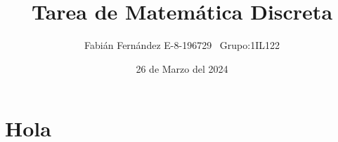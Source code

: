 \documentclass[]{article}
\title{Tarea de Matemática Discreta}
\author{Fabián Fernández E-8-196729   \,\,\,Grupo:1IL122}
\date{26 de Marzo del 2024}
\begin{document}
	
	\maketitle
	
\section{Hola}
	
\end{document}
